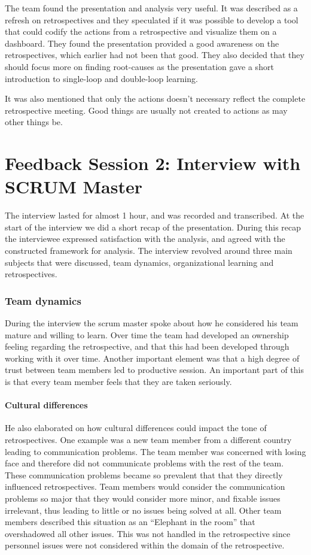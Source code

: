 The team found the presentation and analysis very useful. It was described as a refresh on retrospectives and they speculated if it was possible to develop a tool that could codify the actions from a retrospective and visualize them on a dashboard. They found the presentation provided a good awareness on the retrospectives, which earlier had not been that good. They also decided that they should focus more on finding root-causes as the presentation gave a short introduction to single-loop and double-loop learning.

It was also mentioned that only the actions doesn't necessary reflect the complete retrospective meeting. Good things are usually not created to actions as may other things be. 
\clearpage

\section{Feedback Session 2: Interview with SCRUM Master}
The interview lasted for almost 1 hour, and was recorded and transcribed. At the start of the interview we did a short recap of the presentation. During this recap the interviewee expressed satisfaction with the analysis, and agreed with the constructed framework for analysis. The interview revolved around three main subjects that were discussed, team dynamics, organizational learning and retrospectives.
\subsubsection{Team dynamics}
During the interview the scrum master spoke about how he considered his team mature and willing to learn. Over time the team had developed an ownership feeling regarding the retrospective, and that this had been developed through working with it over time. Another important element was that a high degree of trust between team members led to productive session. An important part of this is that every team member feels that they are taken seriously.

\paragraph{Cultural differences}
He also elaborated on how cultural differences could impact the tone of retrospectives. One example was a new team member from a different country leading to communication problems. The team member was concerned with losing face and therefore did not communicate problems with the rest of the team. These communication problems became so prevalent that that they directly influenced retrospectives. Team members would consider the communication problems so major that they would consider more minor, and fixable issues irrelevant, thus leading to little or no issues being solved at all.  Other team members described this situation as an ``Elephant in the room'' that overshadowed all other issues. This was not handled in the retrospective since personnel issues were not considered within the domain of the retrospective.

